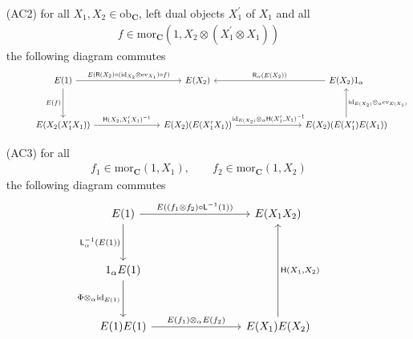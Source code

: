 \begin{thm}
\begin{enumerate}
\begin{enumerate}
\item[(AC2)]
for all $X_{1},X_{2} \in \mathrm{ob}_{\mathbf{C}}$, left dual objects $X_{1}^{\prime}$ of $X_{1}$ and all
\begin{align*}
  f
  \in
  \mathrm{mor}_{\mathbf{C}}
  \left(
    1
    ,
    X_{2}
    \otimes
    (X_{1}^{\prime} \otimes X_{1})
  \right)
\end{align*}
the following diagram commutes
\begin{equation*}
\hspace{1cm}
\begin{tikzcd}[row sep=3.3em,column sep=7.5em]
  E(1)
  \ar{r}{E(\mathsf{R}(X_{2}) \circ (\mathrm{id}_{X_{2}} \otimes \mathrm{ev}_{X_{1}}) \circ f)}
  \ar{d}[swap]{E(f)}
  &
  E(X_{2})
  &
  E(X_{2}) 1_{\alpha}
  \ar{l}[swap]{\mathsf{R}_{\alpha}(E(X_{2}))}
  \\
  E(X_{2} (X_{1}^{\prime} X_{1}))
  \ar{r}{\mathsf{H}(X_{2},X_{1}^{\prime} X_{1})^{-1}}
  &
  E(X_{2}) (E(X_{1}^{\prime} X_{1}))
  \ar{r}{\mathrm{id}_{E(X_{2})} \otimes_{\alpha} \mathsf{H}(X_{1}^{\prime},X_{1})^{-1}}
  &
  E(X_{2}) (E(X_{1}^{\prime}) E(X_{1}))
  \ar{u}[swap]{\mathrm{id}_{E(X_{2})} \otimes_{\alpha} \mathrm{ev}_{E(X_{1})}}
\end{tikzcd}
\end{equation*}

\item[(AC3)]
for all
\begin{align*}
  f_{1}
  \in
  \mathrm{mor}_{\mathbf{C}}(1,X_{1})
  ,\qquad
  f_{2}
  \in
  \mathrm{mor}_{\mathbf{C}}(1,X_{2})
\end{align*}
the following diagram commutes
\begin{equation*}
\begin{tikzcd}[row sep=3.3em,column sep=8em]
  E(1)
  \ar{r}{E((f_{1} \otimes f_{2}) \circ \mathsf{L}^{-1}(1))}
  \ar{d}[swap]{\mathsf{L}_{\alpha}^{-1}(E(1))}
  &
  E(X_{1} X_{2})
  \\
  1_{\alpha} E(1)
  \ar{d}[swap]{\Phi \otimes_{\alpha} \mathrm{id}_{E(1)}}
  &
  \\
  E(1) E(1)
  \ar{r}{E(f_{1}) \otimes_{\alpha} E(f_{2})}
  &
  E(X_{1}) E(X_{2})
  \ar{uu}[swap]{\mathsf{H}(X_{1},X_{2})}
\end{tikzcd}
\end{equation*}


\end{enumerate}
\end{enumerate}
\end{thm}
